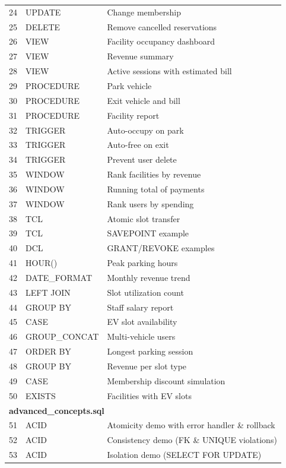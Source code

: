 \documentclass[12pt,a4paper]{article}
\begin{document}
\begin{longtable}{@{}clp{8cm}@{}}
24 & UPDATE   & Change membership \\
25 & DELETE   & Remove cancelled reservations \\
26 & VIEW     & Facility occupancy dashboard \\
27 & VIEW     & Revenue summary \\
28 & VIEW     & Active sessions with estimated bill \\
29 & PROCEDURE & Park vehicle \\
30 & PROCEDURE & Exit vehicle and bill \\
31 & PROCEDURE & Facility report \\
32 & TRIGGER  & Auto-occupy on park \\
33 & TRIGGER  & Auto-free on exit \\
34 & TRIGGER  & Prevent user delete \\
35 & WINDOW   & Rank facilities by revenue \\
36 & WINDOW   & Running total of payments \\
37 & WINDOW   & Rank users by spending \\
38 & TCL      & Atomic slot transfer \\
39 & TCL      & SAVEPOINT example \\
40 & DCL      & GRANT/REVOKE examples \\
41 & HOUR()   & Peak parking hours \\
42 & DATE\_FORMAT & Monthly revenue trend \\
43 & LEFT JOIN & Slot utilization count \\
44 & GROUP BY & Staff salary report \\
45 & CASE     & EV slot availability \\
46 & GROUP\_CONCAT & Multi-vehicle users \\
47 & ORDER BY & Longest parking session \\
48 & GROUP BY & Revenue per slot type \\
49 & CASE     & Membership discount simulation \\
50 & EXISTS   & Facilities with EV slots \\
\midrule
\multicolumn{3}{l}{\textbf{advanced\_concepts.sql}} \\
\midrule
51 & ACID      & Atomicity demo with error handler \& rollback \\
52 & ACID      & Consistency demo (FK \& UNIQUE violations) \\
53 & ACID      & Isolation demo (SELECT FOR UPDATE) \\

\end{longtable}
\end{document}
